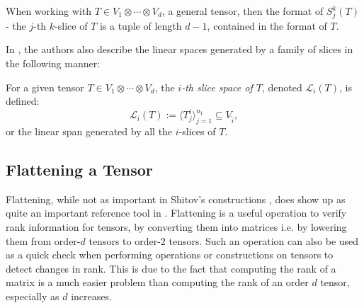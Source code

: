 \documentclass[../Lael_John_MasterThesis_Draft.tex]{subfiles}
\begin{document}
\begin{remark}
    When working with $T \in V_1 \otimes \cdots \otimes V_d$, a general tensor, then the format of $S_j^k(T)$ - the $j$-th $k$-slice of $T$ is a tuple of length $d-1$, contained in the format of $T$.
\end{remark}
In \cite{wang_lower_2023}, the authors also describe the linear spaces generated by a family of slices in the following manner:

\begin{definition}\label{defn:slicespace}
    For a given tensor $T \in V_1 \otimes \cdots \otimes V_d$, the \textit{$i$-th slice space of $T$}, denoted $\mathcal{L}_i(T)$, is defined:
    \begin{equation}\label{eqn:slicespacedefn}
        \mathcal{L}_i(T) := \langle T^i_j \rangle_{j=1}^{n_1} \subseteq V_{\hat{i}},
    \end{equation}
    or the linear span generated by all the $i$-slices of $T$.
\end{definition}

\subsection{Flattening a Tensor}\label{subsection:tensorflattening}
Flattening, while not as important in Shitov's constructions \cites{shitov_comons_2020,shitov_higher_2024,shitov_higher_2024-1}, does show up as quite an important reference tool in \cite{wang_lower_2023}. Flattening is a useful operation to verify rank information for tensors, by converting them into matrices i.e. by lowering them from order-$d$ tensors to order-$2$ tensors. Such an operation can also be used as a quick check when performing operations or constructions on tensors to detect changes in rank. This is due to the fact that computing the rank of a matrix is a much easier problem than computing the rank of an order $d$ tensor, especially as $d$ increases.
\end{document}
